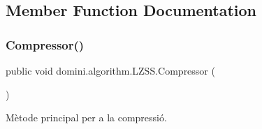 \subsection{Member Function Documentation}
\mbox{\label{classdomini_1_1algorithm_1_1LZSS_a047f2460b8461cdb044604dd639326a3}} 
\subsubsection{\texorpdfstring{Compressor()}{Compressor()}}
{\footnotesize\ttfamily public void domini.\+algorithm.\+L\+Z\+S\+S.\+Compressor (\begin{DoxyParamCaption}{ }\end{DoxyParamCaption})\hspace{0.3cm}{\ttfamily [inline]}}



Mètode principal per a la compressió. 


